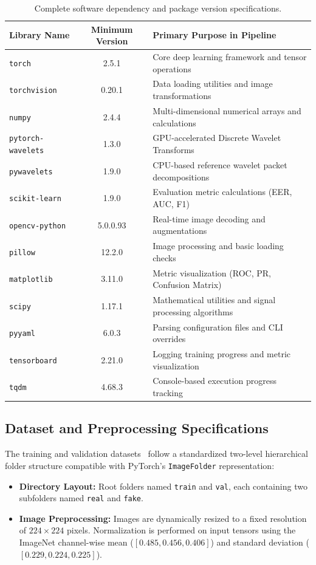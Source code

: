 \documentclass[fleqn,10pt]{wlscirep}
\begin{document}
\begin{table}[ht]
\centering
\caption{Complete software dependency and package version specifications.}
\label{tab:software_env}
\begin{tabular}{|l|c|l|}
\hline
\textbf{Library Name} & \textbf{Minimum Version} & \textbf{Primary Purpose in Pipeline} \\ \hline
\texttt{torch} & 2.5.1 & Core deep learning framework and tensor operations \\ \hline
\texttt{torchvision} & 0.20.1 & Data loading utilities and image transformations \\ \hline
\texttt{numpy} & 2.4.4 & Multi-dimensional numerical arrays and calculations \\ \hline
\texttt{pytorch-wavelets} & 1.3.0 & GPU-accelerated Discrete Wavelet Transforms \\ \hline
\texttt{pywavelets} & 1.9.0 & CPU-based reference wavelet packet decompositions \\ \hline
\texttt{scikit-learn} & 1.9.0 & Evaluation metric calculations (EER, AUC, F1) \\ \hline
\texttt{opencv-python} & 5.0.0.93 & Real-time image decoding and augmentations \\ \hline
\texttt{pillow} & 12.2.0 & Image processing and basic loading checks \\ \hline
\texttt{matplotlib} & 3.11.0 & Metric visualization (ROC, PR, Confusion Matrix) \\ \hline
\texttt{scipy} & 1.17.1 & Mathematical utilities and signal processing algorithms \\ \hline
\texttt{pyyaml} & 6.0.3 & Parsing configuration files and CLI overrides \\ \hline
\texttt{tensorboard} & 2.21.0 & Logging training progress and metric visualization \\ \hline
\texttt{tqdm} & 4.68.3 & Console-based execution progress tracking \\ \hline
\end{tabular}
\end{table}

\subsection*{Dataset and Preprocessing Specifications}
The training and validation datasets~\cite{ref9,ref10,ref11,ref12,ref36,ref37} follow a standardized two-level hierarchical folder structure compatible with PyTorch's \texttt{ImageFolder} representation:
\begin{itemize}
    \item \textbf{Directory Layout:} Root folders named \texttt{train} and \texttt{val}, each containing two subfolders named \texttt{real} and \texttt{fake}.
    \item \textbf{Image Preprocessing:} Images are dynamically resized to a fixed resolution of $224 \times 224$ pixels. Normalization is performed on input tensors using the ImageNet channel-wise mean ($[0.485, 0.456, 0.406]$) and standard deviation ($[0.229, 0.224, 0.225]$).
\end{itemize}
\end{document}
